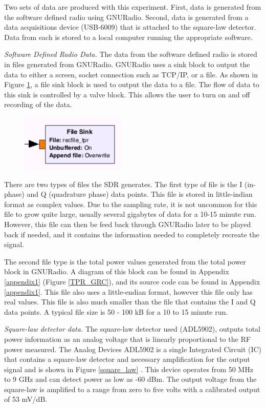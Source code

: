 Two sets of data are produced with this experiment.  First, data is generated from the software defined radio using GNURadio.  Second, data is generated from a data acquisitions device (USB-6009) that is attached to the square-law detector.  Data from each is stored to a local computer running the appropriate software.

\emph{Software Defined Radio Data.}  The data from the software defined radio is stored in files generated from GNURadio.  GNURadio uses a sink block to output the data to either a screen, socket connection such as TCP/IP, or a file.  As shown in Figure \ref{filesink}, a file sink block is used to output the data to a file.  The flow of data to this sink is controlled by a valve block.  This allows the user to turn on and off recording of the data.

{\begin{figure}[h!tb] \centering
\includegraphics[width=5cm]{Images/TPR_Filesink.png}
\label{filesink}
\end{figure}
}

There are two types of files the SDR generates.  The first type of file is the I (in-phase) and Q (quadrature phase) data points.  This file is stored in little-indian format as complex values.  Due to the sampling rate, it is not uncommon for this file to grow quite large, usually several gigabytes of data for a 10-15 minute run.  However, this file can then be feed back through GNURadio later to be played back if needed, and it contains the information needed to completely recreate the signal.

The second file type is the total power values generated from the total power block in GNURadio.  A diagram of this block can be found in Appendix \ref{appendix1} (Figure \ref{TPR_GRC}), and its source code can be found in Appendix \ref{appendix1}.  This file also uses a little-endian format, however this file only has real values.  This file is also much smaller than the file that contains the I and Q data points.  A typical file size is 50 - 100 kB for a 10 to 15 minute run.  

\emph{Square-law detector data.}  The square-law detector used (ADL5902), outputs total power information as an analog voltage that is linearly proportional to the RF power measured.  The Analog Devices ADL5902 is a single Integrated Circuit (IC) that contains a square-law detector and necessary amplification for the output signal and is shown in Figure \ref{square_law} .  This device operates from 50 MHz to 9 GHz and can detect power as low as -60 dBm.  The output voltage from the square-law is amplified to a range from zero to five volts with a calibrated output of 53 mV/dB.  

